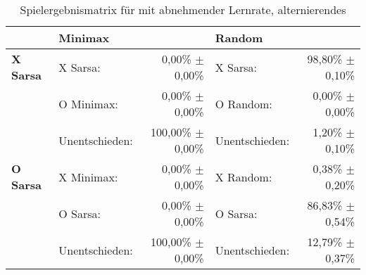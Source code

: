 \begin{table}[!t]
\centering
\caption[Spielergebnismatrix \sarsa: abnehmende Lernrate, alternierendes \splay]{Spielergebnismatrix für \sarsa mit abnehmender Lernrate, alternierendes \splay}

\begin{tabular}{llrlr}
\toprule
 & \multicolumn{2}{l}{\textbf{Minimax}} & \multicolumn{2}{l}{\textbf{Random}} \\ \midrule
\textbf{X Sarsa}        & X Sarsa:          & 0,00\% $\pm$    0,00\%            & X Sarsa:              & 98,80\% $\pm$ 0,10\%  \\
                        & O Minimax:        & 0,00\% $\pm$    0,00\%            & O Random:             & 0,00\% $\pm$  0,00\%  \\
                        & Unentschieden:    & 100,00\% $\pm$  0,00\%            & Unentschieden:        & 1,20\% $\pm$  0,10\%  \\ \cmidrule{2-5}
\textbf{O Sarsa}        & X Minimax:        & 0,00\% $\pm$    0,00\%            & X Random:             & 0,38\% $\pm$  0,20\%  \\
                        & O Sarsa:          & 0,00\% $\pm$    0,00\%            & O Sarsa:              & 86,83\% $\pm$ 0,54\%  \\
                        & Unentschieden:    & 100,00\% $\pm$  0,00\%            & Unentschieden:        & 12,79\% $\pm$ 0,37\%  \\ \bottomrule
\end{tabular}
\end{table}
